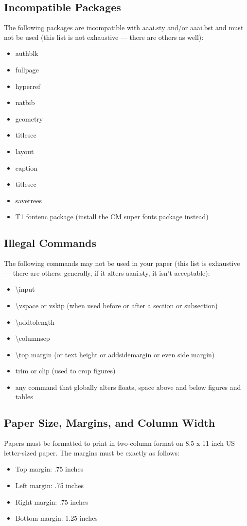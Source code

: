 \documentclass[letterpaper]{article}
\begin{document}
\subsection{Incompatible Packages}
The following packages are incompatible with aaai.sty and/or aaai.bst and must not be used (this list is not exhaustive --- there are others as well):
\begin{itemize}
\item authblk
\item fullpage
\item hyperref
\item natbib
\item geometry
\item titlesec
\item layout
\item caption
\item titlesec
\item savetrees
\item T1 fontenc package (install the CM super fonts package instead)
\end{itemize}

\subsection{Illegal Commands}
The following commands may not be used in your paper (this list is exhaustive --- there are others; generally, if it alters aaai.sty, it isn't acceptable):
\begin{itemize}
\item \textbackslash input
\item \textbackslash vspace or vskip (when used before or after a section or subsection)
\item \textbackslash addtolength 
\item \textbackslash columnsep
\item \textbackslash top margin (or text height or addsidemargin or even side margin)
\item trim or clip (used to crop figures)
\item any command that globally alters floats, space above and below figures and tables
\end{itemize}

\subsection{Paper Size, Margins, and Column Width}
Papers must be formatted to print in two-column format on 8.5 x 11 inch US letter-sized paper. The margins must be exactly as follows: 
\begin{itemize}
\item Top margin: .75 inches
\item Left margin: .75 inches
\item Right margin: .75 inches
\item Bottom margin: 1.25 inches
\end{itemize} 
\end{document}
